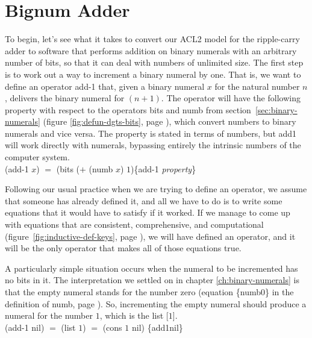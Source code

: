 \section{Bignum Adder}
\label{sec:bignum-adder}

To begin, let's see what it takes to convert our ACL2 model for
the ripple-carry adder to software that performs addition on
binary numerals with an arbitrary number of bits,
so that it can deal with numbers of unlimited size.
The first step is to work out a way to increment a
binary numeral by one.
That is,
we want to define an operator \textsf{add-1} that, given a
binary numeral $x$ for the natural number $n$, delivers the
binary numeral for $(n+1)$.
The operator will have the following
property with respect to the operators \textsf{bits} and \textsf{numb} from
section~\ref{sec:binary-numerals} 
(figure \ref{fig:defun-dgts-bits}, page \pageref{fig:defun-dgts-bits}),
which convert numbers to binary numerals and vice versa.
The property is stated in terms of numbers,
but \textsf{add1} will work directly with numerals,
bypassing entirely the intrinsic numbers of the computer system.
\\
\vspace{2mm}
\hspace*{2cm}
\textsf{(add-1 $x$)} $=$ \textsf{(bits ($+$ (numb $x$) $1$)}\hfill\{add-1 \emph{property}\}

Following our usual practice when we are trying to define an operator,
we assume that someone has already defined it,
and all we have to do is to write some equations that it
would have to satisfy if it worked. If we manage
to come up with equations that are consistent, comprehensive, and computational
(figure~\ref{fig:inductive-def-keys}, page \pageref{fig:inductive-def-keys}),
we will have defined an operator,
and it will be the only operator that makes all of those equations true.

A particularly simple situation occurs when the numeral to be incremented
has no bits in it. The interpretation we settled on
in chapter \ref{ch:binary-numerals} is that
the empty numeral stands for the number zero
(equation \{numb0\} in the definition of \textsf{numb}, page \pageref{nmb-defun}).
So, incrementing the empty numeral should produce a numeral for the number $1$,
which is the list \textsf{[$1$]}.
\\
\vspace{2mm}
\hspace*{2cm}
\textsf{(add-1 nil)} $=$ \textsf{(list $1$)} $=$ \textsf{(cons $1$ nil)}  \hfill \{add1nil\}

